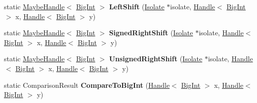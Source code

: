 \begin{DoxyCompactItemize}
\item 
\mbox{\label{classv8_1_1internal_1_1BigInt_a8544b57c766ce15653fe12fff8d966c4}} 
static \mbox{\hyperlink{classv8_1_1internal_1_1MaybeHandle}{Maybe\+Handle}}$<$ \mbox{\hyperlink{classv8_1_1internal_1_1BigInt}{Big\+Int}} $>$ {\bfseries Left\+Shift} (\mbox{\hyperlink{classv8_1_1internal_1_1Isolate}{Isolate}} $\ast$isolate, \mbox{\hyperlink{classv8_1_1internal_1_1Handle}{Handle}}$<$ \mbox{\hyperlink{classv8_1_1internal_1_1BigInt}{Big\+Int}} $>$ x, \mbox{\hyperlink{classv8_1_1internal_1_1Handle}{Handle}}$<$ \mbox{\hyperlink{classv8_1_1internal_1_1BigInt}{Big\+Int}} $>$ y)
\item 
\mbox{\label{classv8_1_1internal_1_1BigInt_a0ebbd1f9a83c1d206bd6a27fa4ba7898}} 
static \mbox{\hyperlink{classv8_1_1internal_1_1MaybeHandle}{Maybe\+Handle}}$<$ \mbox{\hyperlink{classv8_1_1internal_1_1BigInt}{Big\+Int}} $>$ {\bfseries Signed\+Right\+Shift} (\mbox{\hyperlink{classv8_1_1internal_1_1Isolate}{Isolate}} $\ast$isolate, \mbox{\hyperlink{classv8_1_1internal_1_1Handle}{Handle}}$<$ \mbox{\hyperlink{classv8_1_1internal_1_1BigInt}{Big\+Int}} $>$ x, \mbox{\hyperlink{classv8_1_1internal_1_1Handle}{Handle}}$<$ \mbox{\hyperlink{classv8_1_1internal_1_1BigInt}{Big\+Int}} $>$ y)
\item 
\mbox{\label{classv8_1_1internal_1_1BigInt_a36b4fbf2c9302b843c47f4572a00557b}} 
static \mbox{\hyperlink{classv8_1_1internal_1_1MaybeHandle}{Maybe\+Handle}}$<$ \mbox{\hyperlink{classv8_1_1internal_1_1BigInt}{Big\+Int}} $>$ {\bfseries Unsigned\+Right\+Shift} (\mbox{\hyperlink{classv8_1_1internal_1_1Isolate}{Isolate}} $\ast$isolate, \mbox{\hyperlink{classv8_1_1internal_1_1Handle}{Handle}}$<$ \mbox{\hyperlink{classv8_1_1internal_1_1BigInt}{Big\+Int}} $>$ x, \mbox{\hyperlink{classv8_1_1internal_1_1Handle}{Handle}}$<$ \mbox{\hyperlink{classv8_1_1internal_1_1BigInt}{Big\+Int}} $>$ y)
\item 
\mbox{\label{classv8_1_1internal_1_1BigInt_a19424e070ff8e5be9e3c163bb75831eb}} 
static Comparison\+Result {\bfseries Compare\+To\+Big\+Int} (\mbox{\hyperlink{classv8_1_1internal_1_1Handle}{Handle}}$<$ \mbox{\hyperlink{classv8_1_1internal_1_1BigInt}{Big\+Int}} $>$ x, \mbox{\hyperlink{classv8_1_1internal_1_1Handle}{Handle}}$<$ \mbox{\hyperlink{classv8_1_1internal_1_1BigInt}{Big\+Int}} $>$ y)

\end{DoxyCompactItemize}
